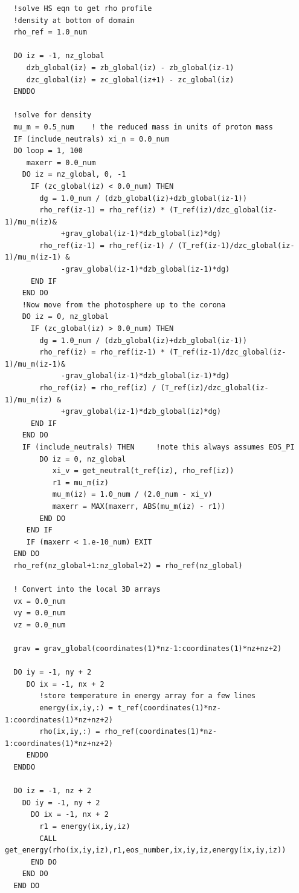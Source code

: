 \documentclass[11pt]{article}
\begin{document}
\begin{verbatim}
  !solve HS eqn to get rho profile
  !density at bottom of domain
  rho_ref = 1.0_num
  
  DO iz = -1, nz_global
     dzb_global(iz) = zb_global(iz) - zb_global(iz-1)
     dzc_global(iz) = zc_global(iz+1) - zc_global(iz)
  ENDDO
                      
  !solve for density
  mu_m = 0.5_num    ! the reduced mass in units of proton mass
  IF (include_neutrals) xi_n = 0.0_num 
  DO loop = 1, 100
     maxerr = 0.0_num    
    DO iz = nz_global, 0, -1
      IF (zc_global(iz) < 0.0_num) THEN
        dg = 1.0_num / (dzb_global(iz)+dzb_global(iz-1))
        rho_ref(iz-1) = rho_ref(iz) * (T_ref(iz)/dzc_global(iz-1)/mu_m(iz)& 
             +grav_global(iz-1)*dzb_global(iz)*dg)
        rho_ref(iz-1) = rho_ref(iz-1) / (T_ref(iz-1)/dzc_global(iz-1)/mu_m(iz-1) & 
             -grav_global(iz-1)*dzb_global(iz-1)*dg)
      END IF
    END DO   
    !Now move from the photosphere up to the corona
    DO iz = 0, nz_global
      IF (zc_global(iz) > 0.0_num) THEN
        dg = 1.0_num / (dzb_global(iz)+dzb_global(iz-1))
        rho_ref(iz) = rho_ref(iz-1) * (T_ref(iz-1)/dzc_global(iz-1)/mu_m(iz-1)& 
             -grav_global(iz-1)*dzb_global(iz-1)*dg)
        rho_ref(iz) = rho_ref(iz) / (T_ref(iz)/dzc_global(iz-1)/mu_m(iz) & 
             +grav_global(iz-1)*dzb_global(iz)*dg)
      END IF
    END DO
    IF (include_neutrals) THEN     !note this always assumes EOS_PI
        DO iz = 0, nz_global 
           xi_v = get_neutral(t_ref(iz), rho_ref(iz)) 
           r1 = mu_m(iz)
           mu_m(iz) = 1.0_num / (2.0_num - xi_v)  
           maxerr = MAX(maxerr, ABS(mu_m(iz) - r1))
        END DO
     END IF 
     IF (maxerr < 1.e-10_num) EXIT
  END DO
  rho_ref(nz_global+1:nz_global+2) = rho_ref(nz_global)
  
  ! Convert into the local 3D arrays
  vx = 0.0_num
  vy = 0.0_num
  vz = 0.0_num
  
  grav = grav_global(coordinates(1)*nz-1:coordinates(1)*nz+nz+2)
  
  DO iy = -1, ny + 2
     DO ix = -1, nx + 2
        !store temperature in energy array for a few lines    
        energy(ix,iy,:) = t_ref(coordinates(1)*nz-1:coordinates(1)*nz+nz+2) 
        rho(ix,iy,:) = rho_ref(coordinates(1)*nz-1:coordinates(1)*nz+nz+2)
     ENDDO
  ENDDO  
  
  DO iz = -1, nz + 2
    DO iy = -1, ny + 2
      DO ix = -1, nx + 2                
        r1 = energy(ix,iy,iz)
        CALL get_energy(rho(ix,iy,iz),r1,eos_number,ix,iy,iz,energy(ix,iy,iz))
      END DO
    END DO
  END DO   
  

\end{verbatim}
\end{document}
